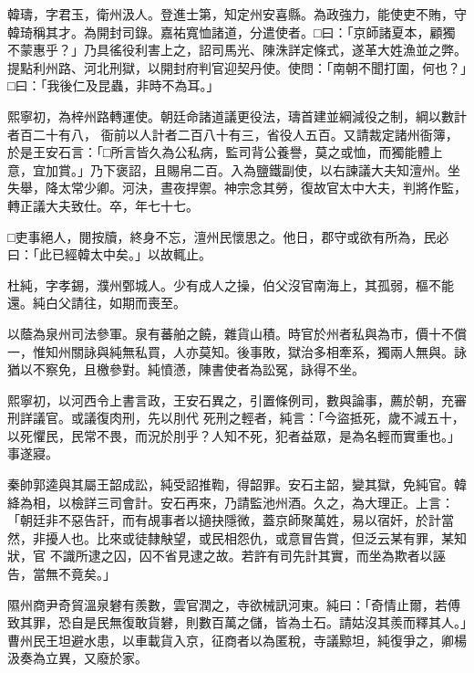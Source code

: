\begin{pinyinscope}
 韓璹，字君玉，衛州汲人。登進士第，知定州安喜縣。為政強力，能使吏不賄，守韓琦稱其才。為開封司錄。嘉祐寬恤諸道，分遣使者。□曰：「京師諸夏本，顧獨不蒙惠乎？」乃具徭役利害上之，詔司馬光、陳洙詳定條式，遂革大姓漁並之弊。提點利州路、河北刑獄，以開封府判官迎契丹使。使問：「南朝不聞打圍，何也？」□曰：「我後仁及昆蟲，非時不為耳。」



 熙寧初，為梓州路轉運使。朝廷命諸道議更役法，璹首建並綱減役之制，綱以數計者百二十有八，
 衙前以人計者二百八十有三，省役人五百。又請裁定諸州衙簿，於是王安石言：「□所言皆久為公私病，監司背公養譽，莫之或恤，而獨能體上意，宜加賞。」乃下褒詔，且賜帛二百。入為鹽鐵副使，以右諫議大夫知澶州。坐失舉，降太常少卿。河決，晝夜捍禦。神宗念其勞，復故官太中大夫，判將作監，轉正議大夫致仕。卒，年七十七。



 □吏事絕人，閱按牘，終身不忘，澶州民懷思之。他日，郡守或欲有所為，民必曰：「此已經韓太中矣。」以故輒止。



 杜純，字孝錫，濮州鄄城人。少有成人之操，伯父沒官南海上，其孤弱，樞不能還。純白父請往，如期而喪至。



 以蔭為泉州司法參軍。泉有蕃舶之饒，雜貨山積。時官於州者私與為市，價十不償一，惟知州關詠與純無私買，人亦莫知。後事敗，獄治多相牽系，獨兩人無與。詠猶以不察免，且檄參對。純憤懣，陳書使者為訟冤，詠得不坐。



 熙寧初，以河西令上書言政，王安石異之，引置條例司，數與論事，薦於朝，充審刑詳議官。或議復肉刑，先以刖代
 死刑之輕者，純言：「今盜抵死，歲不減五十，以死懼民，民常不畏，而況於刖乎？人知不死，犯者益眾，是為名輕而實重也。」事遂寢。



 秦帥郭逵與其屬王韶成訟，純受詔推鞫，得韶罪。安石主韶，變其獄，免純官。韓絳為相，以檢詳三司會計。安石再來，乃請監池州酒。久之，為大理正。上言：「朝廷非不惡告訐，而有覘事者以擿抉隱微，蓋京師聚萬姓，易以宿奸，於計當然，非擾人也。比來或徒隸觖望，或民相怨仇，或意冒告賞，但泛云某有罪，某知狀，官
 不識所逮之囚，囚不省見逮之故。若許有司先計其實，而坐為欺者以誣告，當無不竟矣。」



 隰州商尹奇貿溫泉礬有羨數，雲官潤之，寺欲械訊河東。純曰：「奇情止爾，若傅致其罪，恐自是民無復敢貨礬，則數百萬之儲，皆為土石。請姑沒其羨而釋其人。」曹州民王坦避水患，以車載貨入京，征商者以為匿稅，寺議黥坦，純復爭之，卿楊汲奏為立異，又廢於家。




\end{pinyinscope}
